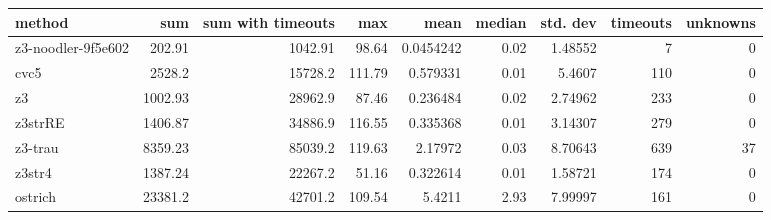 \begin{tabular}{lrrrrrrrr}
\hline
 method             &      sum &   sum with timeouts &    max &      mean &   median &   std. dev &   timeouts &   unknowns \\
\hline
 z3-noodler-9f5e602 &   202.91 &             1042.91 &  98.64 & 0.0454242 &     0.02 &    1.48552 &          7 &          0 \\
 cvc5               &  2528.2  &            15728.2  & 111.79 & 0.579331  &     0.01 &    5.4607  &        110 &          0 \\
 z3                 &  1002.93 &            28962.9  &  87.46 & 0.236484  &     0.02 &    2.74962 &        233 &          0 \\
 z3strRE            &  1406.87 &            34886.9  & 116.55 & 0.335368  &     0.01 &    3.14307 &        279 &          0 \\
 z3-trau            &  8359.23 &            85039.2  & 119.63 & 2.17972   &     0.03 &    8.70643 &        639 &         37 \\
 z3str4             &  1387.24 &            22267.2  &  51.16 & 0.322614  &     0.01 &    1.58721 &        174 &          0 \\
 ostrich            & 23381.2  &            42701.2  & 109.54 & 5.4211    &     2.93 &    7.99997 &        161 &          0 \\
\hline
\end{tabular}
